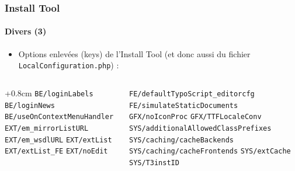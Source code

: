 
\begin{frame}[fragile]
	\frametitle{Install Tool}
	\framesubtitle{Divers (3)}

	\begin{itemize}
		\item Options enlevées (keys) de l'Install Tool\newline
			\small(et donc aussi du fichier \texttt{LocalConfiguration.php}) :\normalsize
	\end{itemize}

	\begin{columns}[T]
		\begin{column}{.5\textwidth}
			\advance\leftskip+0.8cm
			\smaller
				\texttt{BE/loginLabels}\newline
				\texttt{BE/loginNews}\newline
				\texttt{BE/useOnContextMenuHandler}\newline
				\texttt{EXT/em\_mirrorListURL}\newline
				\texttt{EXT/em\_wsdlURL}\newline
				\texttt{EXT/extList}\newline
				\texttt{EXT/extList\_FE}\newline
				\texttt{EXT/noEdit}\newline
			\normalsize
		\end{column}
		\begin{column}{.5\textwidth}
			\smaller
				\texttt{FE/defaultTypoScript\_editorcfg}\newline
				\texttt{FE/simulateStaticDocuments}\newline
				\texttt{GFX/noIconProc}\newline
				\texttt{GFX/TTFLocaleConv}\newline
				\texttt{SYS/additionalAllowedClassPrefixes}\newline
				\texttt{SYS/caching/cacheBackends}\newline
				\texttt{SYS/caching/cacheFrontends}\newline
				\texttt{SYS/extCache}\newline
				\texttt{SYS/T3instID}\newline
			\normalsize
		\end{column}

	\end{columns}

\end{frame}



